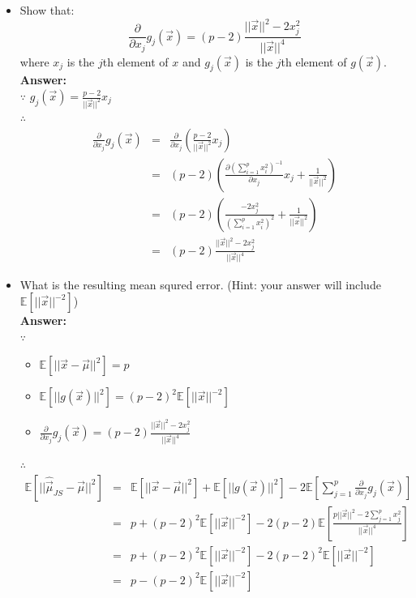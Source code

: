 \documentclass{article}
\begin{document}
\begin{enumerate}
\begin{itemize}
		\item Show that:
		$$\frac{\partial}{\partial x_j}g_j(\vec{x}) = (p-2)\frac{||\vec{x}||^2-2x_j^2}{||\vec{x}||^4}$$
		where $x_j$ is the $j$th element of $x$ and $g_j(\vec{x})$ is the $j$th element of $g(\vec{x})$.
		\\\textbf{Answer:}\\
		$\because$ $g_j(\vec{x})=\frac{p-2}{||\vec{x}||^2}x_j$ \\
		$\therefore$ 
		\begin{equation}
		\nonumber
		\begin{array}{rcl}
		\frac{\partial}{\partial x_j}g_j(\vec{x}) & = & \frac{\partial}{\partial x_j}(\frac{p-2}{||\vec{x}||^2}x_j) \\
		& = & (p-2) (\frac{\partial (\sum_{i=1}^{p}{x^2_i})^{-1}}{\partial x_j}x_j+\frac{1}{||\vec{x}||^2}) \\
		& = & (p-2) (\frac{-2x_j^2}{(\sum_{i=1}^{p}{x^2_i})^{2}}+\frac{1}{||\vec{x}||^2}) \\
		& = & (p-2)\frac{||\vec{x}||^2-2x_j^2}{||\vec{x}||^4}
		\end{array}
		\end{equation}
		
		\item What is the resulting mean squred error. (Hint: your answer will include $\mathbb{E}[||\vec{x}||^{-2}]$)
		\\\textbf{Answer:}\\
		$\because$
		\begin{itemize}
			\item $\mathbb{E}[||\vec{x}-\vec{\mu}||^2] = p$
			\item $\mathbb{E}[||g(\vec{x})||^2] = (p-2)^2\mathbb{E}[||\vec{x}||^{-2}]$
			\item $\frac{\partial}{\partial x_j}g_j(\vec{x}) = (p-2)\frac{||\vec{x}||^2-2x_j^2}{||\vec{x}||^4}$
		\end{itemize}
		$\therefore$\\
		\begin{equation}
		\nonumber
		\begin{array}{rcl}
		\mathbb{E}[||\hat{\vec{\mu}}_{JS}-\vec{\mu}||^2] & = & \mathbb{E}[||\vec{x}-\vec{\mu}||^2]+\mathbb{E}[||g(\vec{x})||^2]-2\mathbb{E}\left[\sum_{j=1}^{p}{\frac{\partial}{\partial x_j}g_j(\vec{x})}\right] \\
		& = & p + (p-2)^2\mathbb{E}[||\vec{x}||^{-2}] - 2(p-2)\mathbb{E}[\frac{p||\vec{x}||^2-2\sum_{j=1}^{p}{x_j^2}}{||\vec{x}||^4}] \\
		& = & p + (p-2)^2\mathbb{E}[||\vec{x}||^{-2}] - 2(p-2)^2\mathbb{E}[||\vec{x}||^{-2}] \\
		& = & p - (p-2)^2\mathbb{E}[||\vec{x}||^{-2}] \\
		\end{array}
		\end{equation}
		

\end{itemize}
\end{enumerate}
\end{document}
